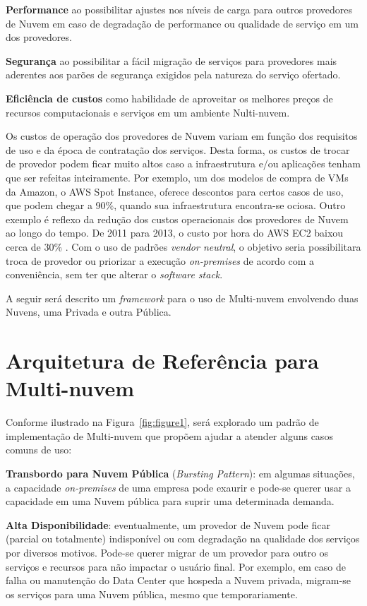 \documentclass[12pt]{article}
\begin{document}
	\textbf{Performance} ao possibilitar ajustes nos níveis de carga para outros provedores de Nuvem em caso de degradação de performance ou qualidade de serviço em um dos provedores.
	
	\textbf{Segurança} ao possibilitar a fácil migração de serviços para provedores mais aderentes aos parões de segurança exigidos pela natureza do serviço ofertado.
	
	\textbf{Eficiência de custos} como habilidade de aproveitar os melhores preços de recursos computacionais e serviços em um ambiente Nulti-nuvem.
	
	Os custos de operação dos provedores de Nuvem variam em função dos requisitos de uso e da época de contratação dos serviços. Desta forma, os custos de trocar de provedor podem ficar muito altos caso a infraestrutura e/ou aplicações tenham que ser refeitas inteiramente. Por exemplo, um dos modelos de compra de VMs da Amazon, o AWS Spot Instance, oferece descontos para certos casos de uso, que podem chegar a 90\%, quando sua infraestrutura encontra-se ociosa. Outro exemplo é reflexo da redução dos custos operacionais dos provedores de Nuvem ao longo do tempo. De 2011 para 2013, o custo por hora do AWS EC2 baixou cerca de 30\% \cite{Golden:2013}. Com o uso de padrões \textit{vendor neutral}, o objetivo seria possibilitara troca de provedor ou priorizar a execução \textit{on-premises} de acordo com a conveniência, sem ter que alterar o \textit{software stack}.
	
	A seguir será descrito um \textit{framework} para o uso de Multi-nuvem envolvendo duas Nuvens, uma Privada e outra Pública. 
	
	\section{Arquitetura de Referência para Multi-nuvem}
	
	Conforme ilustrado na Figura~\ref{fig:figure1}, será explorado um padrão de implementação de Multi-nuvem que propõem ajudar a atender alguns casos comuns de uso:
	
	\textbf{Transbordo para Nuvem Pública} (\textit{Bursting Pattern}): em algumas situações, a capacidade \textit{on-premises} de uma empresa pode exaurir e pode-se querer usar a capacidade em uma Nuvem pública para suprir uma determinada demanda.
	
	\textbf{Alta Disponibilidade}: eventualmente, um provedor de Nuvem pode ficar (parcial ou totalmente) indisponível ou com degradação na qualidade dos serviços por diversos motivos. Pode-se querer migrar de um provedor para outro os serviços e recursos para não impactar o usuário final. Por exemplo, em caso de falha ou manutenção do Data Center que hospeda a Nuvem privada, migram-se os serviços para uma Nuvem pública, mesmo que temporariamente.
	   
\end{document}
